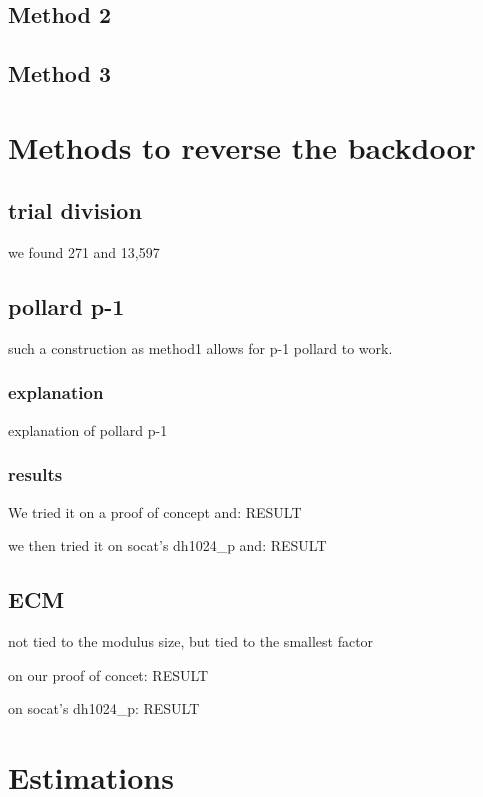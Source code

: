 \documentclass[a4paper,11pt]{article}
\begin{document}
\subsection{Method 2}

\subsection{Method 3}

\section{Methods to reverse the backdoor}

\subsection{trial division}

we found 271 and 13,597

\subsection{pollard p-1}

such a construction as method1 allows for p-1 pollard to work.

\subsubsection{explanation}

explanation of pollard p-1

\subsubsection{results}

We tried it on a proof of concept and: RESULT

we then tried it on socat's dh1024_p and: RESULT

\subsection{ECM}

not tied to the modulus size, but tied to the smallest factor

on our proof of concet: RESULT

on socat's dh1024_p: RESULT

\section{Estimations}
\end{document}
